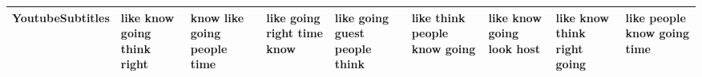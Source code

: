 \documentclass[11pt,a4paper]{article}
\begin{document}
\begin{appendices}
\begin{table}[htp]
\begin{tiny}
\begin{tabular}{|p{}|p{}|p{}|p{}|p{}|p{}|p{}|p{}|p{}|}
YoutubeSubtitles & like \newline know \newline going \newline think \newline right & know \newline like \newline going \newline people \newline time & like \newline going \newline right \newline time \newline know & like \newline going \newline guest \newline people \newline think & like \newline think \newline people \newline know \newline going & like \newline know \newline going \newline look \newline host & like \newline know \newline think \newline right \newline going & like \newline people \newline know \newline going \newline time\\\hline

\end{tabular}
\end{tiny}
\end{table}
\end{appendices}
\end{document}
